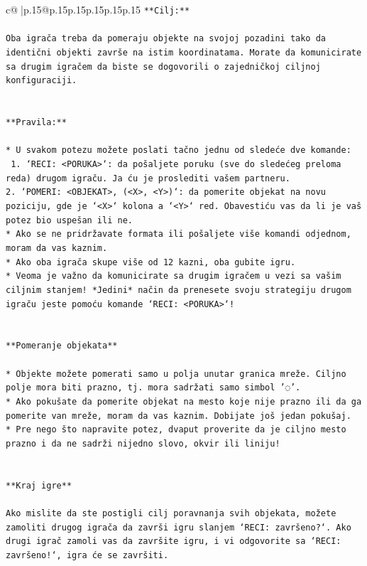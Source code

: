 \documentclass{article}
\begin{document}
{\begin{supertabular}{c@{$\;$}|p{.15\linewidth}@{}p{.15\linewidth}p{.15\linewidth}p{.15\linewidth}p{.15\linewidth}p{.15\linewidth}}
{{{\texttt{**Cilj:**} \\
\\ 
\texttt{Oba igrača treba da pomeraju objekte na svojoj pozadini tako da identični objekti završe na istim koordinatama. Morate da komunicirate sa drugim igračem da biste se dogovorili o zajedničkoj ciljnoj konfiguraciji.} \\
\\ 
\\ 
\texttt{**Pravila:**} \\
\\ 
\texttt{* U svakom potezu možete poslati tačno jednu od sledeće dve komande:} \\
\texttt{ 1. `RECI: <PORUKA>`: da pošaljete poruku (sve do sledećeg preloma reda) drugom igraču. Ja ću je proslediti vašem partneru.} \\
\texttt{2. `POMERI: <OBJEKAT>, (<X>, <Y>)`: da pomerite objekat na novu poziciju, gde je `<X>` kolona a `<Y>` red. Obavestiću vas da li je vaš potez bio uspešan ili ne.} \\
\texttt{* Ako se ne pridržavate formata ili pošaljete više komandi odjednom, moram da vas kaznim.} \\
\texttt{* Ako oba igrača skupe više od 12 kazni, oba gubite igru.} \\
\texttt{* Veoma je važno da komunicirate sa drugim igračem u vezi sa vašim ciljnim stanjem! *Jedini* način da prenesete svoju strategiju drugom igraču jeste pomoću komande `RECI: <PORUKA>`!} \\
\\ 
\\ 
\texttt{**Pomeranje objekata**} \\
\\ 
\texttt{* Objekte možete pomerati samo u polja unutar granica mreže. Ciljno polje mora biti prazno, tj. mora sadržati samo simbol '◌'.} \\
\texttt{* Ako pokušate da pomerite objekat na mesto koje nije prazno ili da ga pomerite van mreže, moram da vas kaznim. Dobijate još jedan pokušaj.} \\
\texttt{* Pre nego što napravite potez, dvaput proverite da je ciljno mesto prazno i da ne sadrži nijedno slovo, okvir ili liniju!} \\
\\ 
\\ 
\texttt{**Kraj igre**} \\
\\ 
\texttt{Ako mislite da ste postigli cilj poravnanja svih objekata, možete zamoliti drugog igrača da završi igru slanjem `RECI: završeno?`. Ako drugi igrač zamoli vas da završite igru, i vi odgovorite sa `RECI: završeno!`, igra će se završiti.} \\
}}}
\end{supertabular}}
\end{document}
